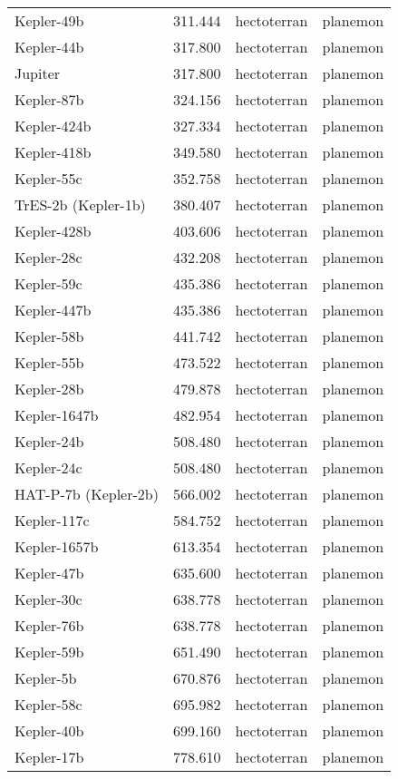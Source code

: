 \documentclass[
  letterpaper,
]{book}
\begin{document}
\begin{longtable}[]{@{}llll@{}}
Kepler-49b & 311.444 & hectoterran & planemon \\
Kepler-44b & 317.800 & hectoterran & planemon \\
Jupiter & 317.800 & hectoterran & planemon \\
Kepler-87b & 324.156 & hectoterran & planemon \\
Kepler-424b & 327.334 & hectoterran & planemon \\
Kepler-418b & 349.580 & hectoterran & planemon \\
Kepler-55c & 352.758 & hectoterran & planemon \\
TrES-2b (Kepler-1b) & 380.407 & hectoterran & planemon \\
Kepler-428b & 403.606 & hectoterran & planemon \\
Kepler-28c & 432.208 & hectoterran & planemon \\
Kepler-59c & 435.386 & hectoterran & planemon \\
Kepler-447b & 435.386 & hectoterran & planemon \\
Kepler-58b & 441.742 & hectoterran & planemon \\
Kepler-55b & 473.522 & hectoterran & planemon \\
Kepler-28b & 479.878 & hectoterran & planemon \\
Kepler-1647b & 482.954 & hectoterran & planemon \\
Kepler-24b & 508.480 & hectoterran & planemon \\
Kepler-24c & 508.480 & hectoterran & planemon \\
HAT-P-7b (Kepler-2b) & 566.002 & hectoterran & planemon \\
Kepler-117c & 584.752 & hectoterran & planemon \\
Kepler-1657b & 613.354 & hectoterran & planemon \\
Kepler-47b & 635.600 & hectoterran & planemon \\
Kepler-30c & 638.778 & hectoterran & planemon \\
Kepler-76b & 638.778 & hectoterran & planemon \\
Kepler-59b & 651.490 & hectoterran & planemon \\
Kepler-5b & 670.876 & hectoterran & planemon \\
Kepler-58c & 695.982 & hectoterran & planemon \\
Kepler-40b & 699.160 & hectoterran & planemon \\
Kepler-17b & 778.610 & hectoterran & planemon \\

\end{longtable}
\end{document}
